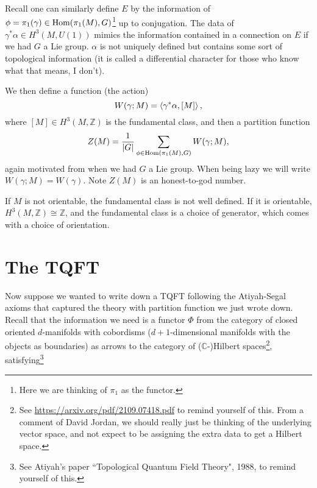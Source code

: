 \documentclass{article}
\begin{document}
Recall one can similarly define $E$ by the information of $\phi = \pi_1(\gamma) \in \operatorname{Hom}(\pi_1(M), G)$\footnote{Here we are thinking of $\pi_1$ as the functor.} up to conjugation. The data of $\gamma^\ast \alpha \in H^3(M, U(1))$ mimics the information contained in a connection on $E$ if we had $G$ a Lie group. $\alpha$ is not uniquely defined but contains some sort of topological information (it is called a differential character for those who know what that means, I don't).

We then define a function (the action)
\[
W(\gamma; M) = \left\langle \gamma^\ast \alpha, [M] \right\rangle,
\]
where $[M] \in H^3(M, \mathbb{Z})$ is the fundamental class, and then a partition function 
\[
Z(M) = \frac{1}{\left\lvert G \right\rvert} \sum_{\phi \in \operatorname{Hom}(\pi_1(M), G)} W(\gamma; M),
\]
again motivated from when we had $G$ a Lie group. When being lazy we will write $W(\gamma ; M) = W(\gamma)$. Note $Z(M)$ is an honest-to-god number. 
\begin{remark}
	If $M$ is not orientable, the fundamental class is not well defined. If it is orientable, $H^3(M, \mathbb{Z}) \cong \mathbb{Z}$, and the fundamental class is a choice of generator, which comes with a choice of orientation.  
\end{remark}

\section{The TQFT}

Now suppose we wanted to write down a TQFT following the Atiyah-Segal axioms that captured the theory with partition function we just wrote down. Recall that the information we need is a functor $\Phi$ from the category of closed oriented $d$-manifolds with cobordisms ($d+1$-dimensional manifolds with the objects as boundaries) as arrows to the category of ($\mathbb{C}$-)Hilbert spaces\footnote{See \url{https://arxiv.org/pdf/2109.07418.pdf} to remind yourself of this. From a comment of David Jordan, we should really just be thinking of the underlying vector space, and not expect to be assigning the extra data to get a Hilbert space.}, satisfying\footnote{See Atiyah's paper ``Topological Quantum Field Theory", 1988, to remind yourself of this.} 
\end{document}
